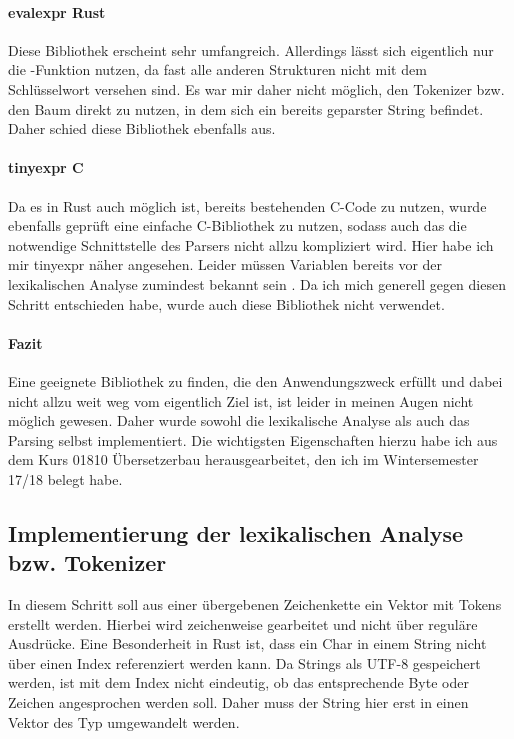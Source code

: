 \documentclass[11pt,a4paper, ngerman]{article}
\begin{document}
\paragraph{evalexpr Rust} \cite{CrateEvalexpr} Diese Bibliothek erscheint sehr umfangreich. Allerdings lässt sich eigentlich nur die -Funktion nutzen, da fast alle anderen Strukturen nicht mit dem Schlüsselwort  versehen sind. Es war mir daher nicht möglich, den Tokenizer bzw. den Baum direkt zu nutzen, in dem sich ein bereits geparster String befindet. Daher schied diese Bibliothek ebenfalls aus.

\paragraph{tinyexpr C} \cite{CTinyexpr} Da es in Rust auch möglich ist, bereits bestehenden C-Code zu nutzen, wurde ebenfalls geprüft eine einfache C-Bibliothek zu nutzen, sodass auch das die notwendige Schnittstelle des Parsers nicht allzu kompliziert wird. Hier habe ich mir tinyexpr näher angesehen. Leider müssen Variablen bereits vor der lexikalischen Analyse zumindest bekannt sein \cite{CTinyexprReadme}. Da ich mich generell gegen diesen Schritt entschieden habe, wurde auch diese Bibliothek nicht verwendet.

\paragraph{Fazit} Eine geeignete Bibliothek zu finden, die den Anwendungszweck erfüllt und dabei nicht allzu weit weg vom eigentlich Ziel ist, ist leider in meinen Augen nicht möglich gewesen. Daher wurde sowohl die lexikalische Analyse als auch das Parsing selbst implementiert. Die wichtigsten Eigenschaften hierzu habe ich aus dem Kurs 01810 Übersetzerbau herausgearbeitet, den ich im Wintersemester 17/18 belegt habe.

\subsection{Implementierung der lexikalischen Analyse bzw. Tokenizer} In diesem Schritt soll aus einer übergebenen Zeichenkette ein Vektor mit Tokens erstellt werden. Hierbei wird zeichenweise gearbeitet und nicht über reguläre Ausdrücke. Eine Besonderheit in Rust ist, dass ein Char in einem String nicht über einen Index referenziert werden kann. Da Strings als UTF-8 gespeichert werden, ist mit dem Index nicht eindeutig, ob das entsprechende Byte oder Zeichen angesprochen werden soll. Daher muss der String hier erst in einen Vektor des Typ  umgewandelt werden.
\end{document}
